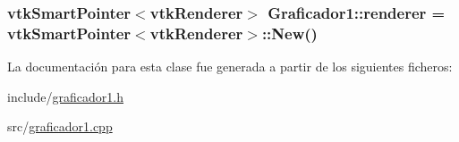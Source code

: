 \subsubsection[{\texorpdfstring{renderer}{renderer}}]{\setlength{\rightskip}{0pt plus 5cm}vtk\+Smart\+Pointer$<$vtk\+Renderer$>$ Graficador1\+::renderer = vtk\+Smart\+Pointer$<$vtk\+Renderer$>$\+::New()}\hypertarget{class_graficador1_a37f34d5e7cc90e5ce119de4b3c5e99a5}{}\label{class_graficador1_a37f34d5e7cc90e5ce119de4b3c5e99a5}


La documentación para esta clase fue generada a partir de los siguientes ficheros\+:\begin{DoxyCompactItemize}
\item 
include/\hyperlink{graficador1_8h}{graficador1.\+h}\item 
src/\hyperlink{graficador1_8cpp}{graficador1.\+cpp}\end{DoxyCompactItemize}

